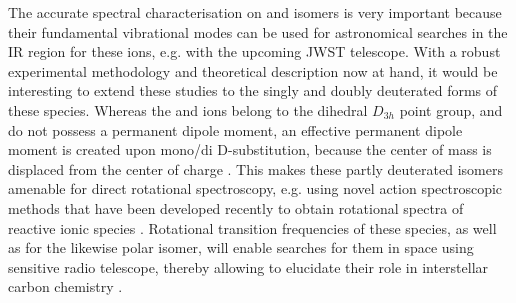 The accurate spectral characterisation on \iso and \isoD isomers is very important because their fundamental vibrational modes can be used for astronomical searches in the IR region for these ions, e.g. with the upcoming JWST telescope. With a robust experimental methodology and theoretical description now at hand, it would be interesting to extend these studies to the singly and doubly deuterated forms of these species. Whereas the \cyc and \cycD ions belong to the dihedral $D_{3h}$ point group, and do not possess a permanent dipole moment, an effective permanent dipole moment is created upon mono/di D-substitution, because the center of mass is displaced from the center of charge \cite{Huang2011}. This makes these partly deuterated isomers amenable for direct rotational spectroscopy, e.g. using novel action spectroscopic methods that have been developed recently to obtain rotational spectra of reactive ionic species \citep{brunken_laboratory_2014,Brunken2017,Markus2019,thorwirth_pure_2019}. Rotational transition frequencies of these species, as well as for the likewise polar \lin isomer, will enable searches for them in space using sensitive radio telescope, thereby allowing to elucidate their role in interstellar carbon chemistry \citep{SBS2013,LAW2017}.\\
